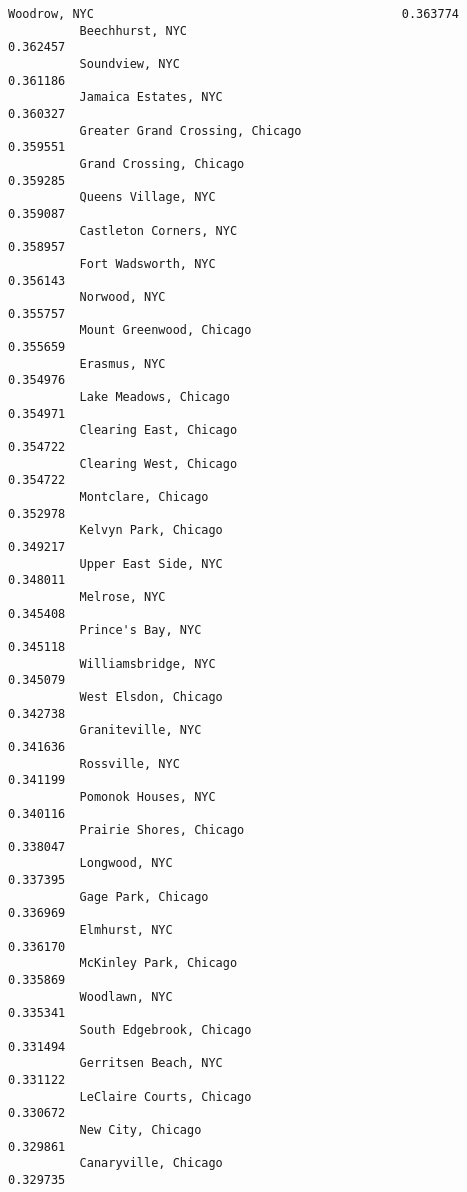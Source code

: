 \documentclass[11pt]{article}
\begin{document}
\begin{Verbatim}[commandchars=\\\{\}]
          Woodrow, NYC                                           0.363774
          Beechhurst, NYC                                        0.362457
          Soundview, NYC                                         0.361186
          Jamaica Estates, NYC                                   0.360327
          Greater Grand Crossing, Chicago                        0.359551
          Grand Crossing, Chicago                                0.359285
          Queens Village, NYC                                    0.359087
          Castleton Corners, NYC                                 0.358957
          Fort Wadsworth, NYC                                    0.356143
          Norwood, NYC                                           0.355757
          Mount Greenwood, Chicago                               0.355659
          Erasmus, NYC                                           0.354976
          Lake Meadows, Chicago                                  0.354971
          Clearing East, Chicago                                 0.354722
          Clearing West, Chicago                                 0.354722
          Montclare, Chicago                                     0.352978
          Kelvyn Park, Chicago                                   0.349217
          Upper East Side, NYC                                   0.348011
          Melrose, NYC                                           0.345408
          Prince's Bay, NYC                                      0.345118
          Williamsbridge, NYC                                    0.345079
          West Elsdon, Chicago                                   0.342738
          Graniteville, NYC                                      0.341636
          Rossville, NYC                                         0.341199
          Pomonok Houses, NYC                                    0.340116
          Prairie Shores, Chicago                                0.338047
          Longwood, NYC                                          0.337395
          Gage Park, Chicago                                     0.336969
          Elmhurst, NYC                                          0.336170
          McKinley Park, Chicago                                 0.335869
          Woodlawn, NYC                                          0.335341
          South Edgebrook, Chicago                               0.331494
          Gerritsen Beach, NYC                                   0.331122
          LeClaire Courts, Chicago                               0.330672
          New City, Chicago                                      0.329861
          Canaryville, Chicago                                   0.329735

\end{Verbatim}
\end{document}

